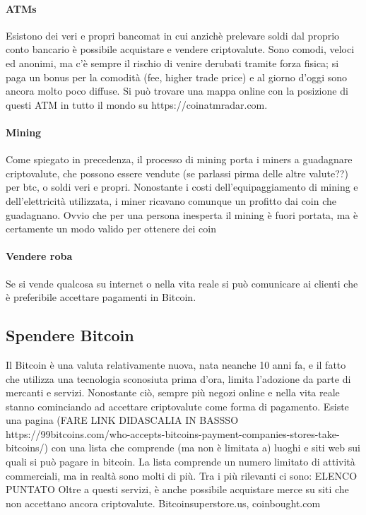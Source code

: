 \documentclass {article}
\begin{document}
\paragraph {ATMs}


Esistono dei veri e propri bancomat in cui anzichè prelevare soldi dal proprio conto bancario è possibile acquistare e vendere criptovalute.
Sono comodi, veloci ed anonimi, ma c'è sempre il rischio di venire derubati tramite forza fisica; si paga un bonus per la comodità (fee, higher trade price) e al giorno d'oggi sono ancora molto poco diffuse.
Si può trovare una mappa online con la posizione di questi ATM in tutto il mondo su https://coinatmradar.com.


\paragraph {Mining}


Come spiegato in precedenza, il processo di mining porta i miners a guadagnare criptovalute, che possono essere vendute (se parlassi pirma delle altre valute??) per btc, o soldi veri e propri.
Nonostante i costi dell'equipaggiamento di mining e dell'elettricità utilizzata, i miner ricavano comunque un profitto dai coin che guadagnano.
Ovvio che per una persona inesperta il mining è fuori portata, ma è certamente un modo valido per ottenere dei coin

\paragraph {Vendere roba}


Se si vende qualcosa su internet o nella vita reale si può comunicare ai clienti che è preferibile accettare pagamenti in Bitcoin.


\subsection {Spendere Bitcoin}


Il Bitcoin è una valuta relativamente nuova, nata neanche 10 anni fa, e il fatto che utilizza una tecnologia sconosiuta prima d'ora, limita l'adozione da parte di mercanti e servizi.
Nonostante ciò, sempre più negozi online e nella vita reale stanno cominciando ad accettare criptovalute come forma di pagamento. Esiste una pagina (FARE LINK DIDASCALIA IN BASSSO https://99bitcoins.com/who-accepts-bitcoins-payment-companies-stores-take-bitcoins/) con una lista che comprende (ma non è limitata a) luoghi e siti web sui quali si può pagare in bitcoin.
La lista comprende un numero limitato di attività commerciali, ma in realtà sono molti di più.
Tra i più rilevanti ci sono: ELENCO PUNTATO
Oltre a questi servizi, è anche possibile acquistare merce su siti che non accettano ancora criptovalute.
Bitcoinsuperstore.us, coinbought.com
\end{document}
